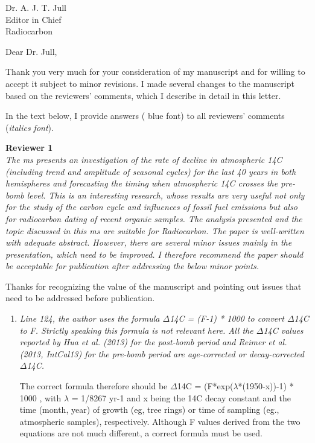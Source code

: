 \documentclass[11pt]{bgcletter}
\begin{document}
\begin{letter}{Dr. A. J. T. Jull \\
 Editor in Chief \\ Radiocarbon}

\opening{Dear Dr. Jull,}
Thank you very much for your consideration of my manuscript and for willing to accept it subject to minor revisions. I made several changes to the manuscript based on the reviewers' comments, which I describe in detail in this letter. 

In the text below, I provide answers ({\color{blue} blue font}) to all reviewers' comments ({\it italics font}). 

{\bf Reviewer 1} \\
{\it The ms presents an investigation of the rate of decline in atmospheric 14C (including trend and amplitude of seasonal cycles) for the last 40 years in both hemispheres and forecasting the timing when atmospheric 14C crosses the pre-bomb level. This is an interesting research, whose results are very useful not only for the study of the carbon cycle and influences of fossil fuel emissions but also for radiocarbon dating of recent organic samples. The analysis presented and the topic discussed in this ms are suitable for Radiocarbon. The paper is well-written with adequate abstract. However, there are several minor issues mainly in the presentation, which need to be improved. I therefore recommend the paper should be acceptable for publication after addressing the below minor points.
}

{\color{blue} Thanks for recognizing the value of the manuscript and pointing out issues that need to be addressed before publication. }

\begin{enumerate}
\item {\it Line 124, the author uses the formula $\Delta$14C = (F-1) * 1000 to convert $\Delta$14C to F. Strictly speaking this formula is not relevant here. All the $\Delta$14C values reported by Hua et al. (2013) for the post-bomb period and Reimer et al. (2013, IntCal13) for the pre-bomb period are age-corrected or decay-corrected $\Delta$14C. 

The correct formula therefore should be $\Delta$14C = (F*exp($\lambda$*(1950-x))-1) * 1000 , with $\lambda$ = 1/8267 yr-1 and x being the 14C decay constant and the time (month, year) of growth (eg, tree rings) or time of sampling (eg., atmospheric samples), respectively. Although F values derived from the two equations are not much different, a correct formula must be used.}


\end{enumerate}
\end{letter}
\end{document}
